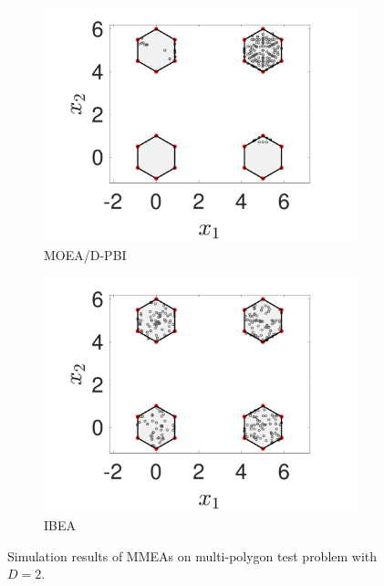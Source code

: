 \documentclass[conference]{IEEEtran}
\begin{document}
\begin{figure}[t!]
    \begin{subfigure}[b]{.24\textwidth}
    \includegraphics[width=\linewidth]{Section5/dim2/PS/MOEAD_PBI}
    \caption{MOEA/D-PBI}
    \end{subfigure}
    \begin{subfigure}[b]{.24\textwidth}
    \includegraphics[width=\linewidth]{Section5/dim2/PS/IBEA}
    \caption{IBEA}
    \end{subfigure}

    \caption{Simulation results of MMEAs on multi-polygon test problem with $D=2$.}
    \label{fig: MOEAs PS dim=2}
\end{figure}
\end{document}
